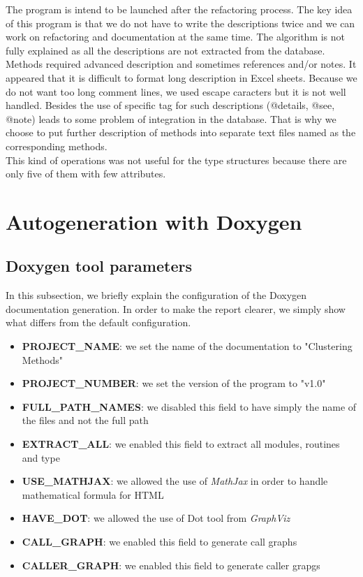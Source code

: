 The program is intend to be launched after the refactoring process. The key idea of this program is that we do not have to write the descriptions twice and we can work on refactoring and documentation at the same time. The algorithm is not fully explained as all the descriptions are not extracted from the database. Methods required advanced description and sometimes references and/or notes. It appeared that it is difficult to format long description in Excel sheets. Because we do not want too long comment lines, we used escape caracters but it is not well handled.  Besides the use of specific tag for such descriptions (@details, @see, @note) leads to some problem of integration in the database. That is why we choose to put further description of methods into separate text files named as the corresponding methods.\\

This kind of operations was not useful for the type structures because there are only five of them with few attributes.
\section{Autogeneration with Doxygen}
\subsection{Doxygen tool parameters}
In this subsection, we briefly explain the configuration of the Doxygen documentation generation. In order to make the report clearer, we simply show what differs from the default configuration.
\begin{itemize}
\item \textbf{PROJECT\_NAME}: we set the name of the documentation to "Clustering Methods"
\item \textbf{PROJECT\_NUMBER}: we set the version of the program to "v1.0"
\item \textbf{FULL\_PATH\_NAMES}: we disabled this field to have simply the name of the files and not the full path
\item \textbf{EXTRACT\_ALL}: we enabled this field to extract all modules, routines and type
\item \textbf{USE\_MATHJAX}: we allowed the use of \textit{MathJax} in order to handle mathematical formula for HTML
\item \textbf{HAVE\_DOT}: we allowed the use of Dot tool from \textit{GraphViz}
\item \textbf{CALL\_GRAPH}: we enabled this field to generate call graphs
\item \textbf{CALLER\_GRAPH}: we enabled this field to generate caller grapgs
\end{itemize}
